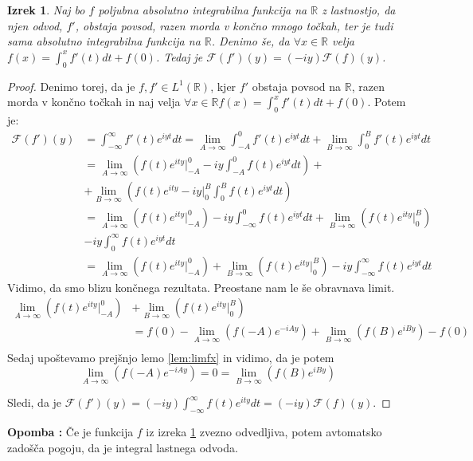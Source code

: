 \documentclass[a4paper, 10pt]{article}
\newtheorem{izr}{Izrek}
\newcounter{opombe}
\newenvironment{opomba}{\begin{flushleft}\refstepcounter{opombe}\textbf{Opomba \arabic{opombe}:}}{\hfill\end{flushleft}}
\newcommand{\mth}[1]{\ensuremath{\mathbb{#1}}}
\newcommand{\R}{\mth{R}}
\begin{document}
			\begin{izr}
				\label{izr:FourierTodv1}
				Naj bo $f$ poljubna absolutno integrabilna funkcija na $\R$ z lastnostjo, da njen odvod, $f'$, obstaja povsod, razen morda v končno mnogo točkah, ter je tudi sama absolutno integrabilna funkcija na $\R$. Denimo še, da $\forall x\in \R$ velja $f(x) = \int_0^x f'(t)dt + f(0)$. Tedaj je $\mathcal{F}(f')(y) = (-iy)\mathcal{F}(f)(y)$.
			\end{izr}
			\begin{proof}
				 Denimo torej, da je $f, f'\in L^1(\R)$, kjer $f'$ obstaja povsod na $\R$, razen morda v končno točkah in naj velja $\forall x\in \R f(x) = \int_0^x f'(t)dt + f(0)$. Potem je: \begin{align*}
					\mathcal{F}(f')(y) &=  \int_{-\infty}^{\infty}f'(t)e^{iyt}dt = \lim_{A\to\infty}\int_{-A}^{0}f'(t)e^{iyt}dt + \lim_{B\to\infty}\int_{0}^{B}f'(t)e^{iyt}dt \\
					&= \lim_{A\to\infty}(f(t)e^{ity} |_{-A}^0 - iy\int_{-A}^{0}f(t)e^{iyt}dt) +\\ 
					&+ \lim_{B\to\infty}(f(t)e^{ity}-iy|_0^{B}\int_{0}^{B}f(t)e^{iyt}dt) \\
					&= \lim_{A\to\infty}(f(t)e^{ity} |_{-A}^0) - iy\int_{-\infty}^{0}f(t)e^{iyt}dt + \lim_{B\to\infty}(f(t)e^{ity}|_0^{B}) \\ &- iy\int_{0}^{\infty}f(t)e^{iyt}dt \\
					&=\lim_{A\to\infty}(f(t)e^{ity} |_{-A}^0) + \lim_{B\to\infty}(f(t)e^{ity}|_0^{B})- iy\int_{-\infty}^{\infty}f(t)e^{iyt}dt 
				\end{align*}
				Vidimo, da smo blizu končnega rezultata. Preostane nam le še obravnava limit.\begin{align*}
					\lim_{A\to\infty}(f(t)e^{ity} |_{-A}^0) &+ \lim_{B\to\infty}(f(t)e^{ity}|_0^{B}) \\
					&=  f(0) - \lim_{A\to\infty}(f(-A)e^{-iAy}) + \lim_{B\to\infty}(f(B)e^{iBy})- f(0) \\
				\end{align*}
				Sedaj upoštevamo prejšnjo lemo \ref{lem:limfx} in vidimo, da je potem $$\lim_{A\to\infty}(f(-A)e^{-iAy}) = 0 = \lim_{B\to\infty}(f(B)e^{iBy})$$
				
				Sledi, da je $\mathcal{F}(f')(y) = (-iy)\int_{-\infty}^{\infty}f(t)e^{ity}dt = (-iy)\mathcal{F}(f)(y)$.
			\end{proof}
			\begin{opomba}
				Če je funkcija $f$ iz izreka \ref{izr:FourierTodv1} zvezno odvedljiva, potem avtomatsko zadošča pogoju, da je integral lastnega odvoda.
			\end{opomba}
\end{document}
